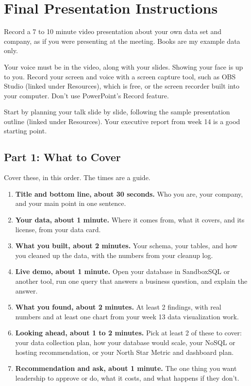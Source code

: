\documentclass[12pt]{article}
\begin{document}
\section*{Final Presentation Instructions}
Record a 7 to 10 minute video presentation about your own data set and company, as if you were presenting at the meeting. Books are my example data only.

Your voice must be in the video, along with your slides. Showing your face is up to you. Record your screen and voice with a screen capture tool, such as OBS Studio (linked under Resources), which is free, or the screen recorder built into your computer. Don't use PowerPoint's Record feature.

Start by planning your talk slide by slide, following the sample presentation outline (linked under Resources). Your executive report from week 14 is a good starting point.

\subsection*{Part 1: What to Cover}
Cover these, in this order. The times are a guide.
\begin{enumerate}
    \item \textbf{Title and bottom line, about 30 seconds.} Who you are, your company, and your main point in one sentence.
    \item \textbf{Your data, about 1 minute.} Where it comes from, what it covers, and its license, from your data card.
    \item \textbf{What you built, about 2 minutes.} Your schema, your tables, and how you cleaned up the data, with the numbers from your cleanup log.
    \item \textbf{Live demo, about 1 minute.} Open your database in SandboxSQL or another tool, run one query that answers a business question, and explain the answer.
    \item \textbf{What you found, about 2 minutes.} At least 2 findings, with real numbers and at least one chart from your week 13 data visualization work.
    \item \textbf{Looking ahead, about 1 to 2 minutes.} Pick at least 2 of these to cover: your data collection plan, how your database would scale, your NoSQL or hosting recommendation, or your North Star Metric and dashboard plan.
    \item \textbf{Recommendation and ask, about 1 minute.} The one thing you want leadership to approve or do, what it costs, and what happens if they don't.
\end{enumerate}
\end{document}
